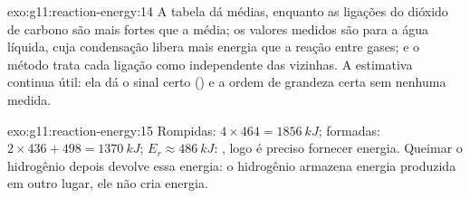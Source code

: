 \begin{solution}{exo:g11:reaction-energy:14}
A tabela dá  médias, enquanto as ligações  do
dióxido de carbono são mais fortes que a média; os valores medidos são
para a água líquida, cuja condensação libera mais energia que a reação
entre gases; e o método trata cada ligação como independente das
vizinhas. A estimativa continua útil: ela dá o sinal certo ()
e a ordem de grandeza certa sem nenhuma medida.
\end{solution}

\begin{solution}{exo:g11:reaction-energy:15}
Rompidas: $4 \times 464 = \qty{1856}{kJ}$; formadas: $2 \times 436 + 498 =
\qty{1370}{kJ}$; $E_r \approx \qty{+486}{kJ}$: , logo é
preciso fornecer energia. Queimar o hidrogênio depois devolve essa
energia: o hidrogênio armazena energia produzida em outro lugar, ele não
cria energia.
\end{solution}

